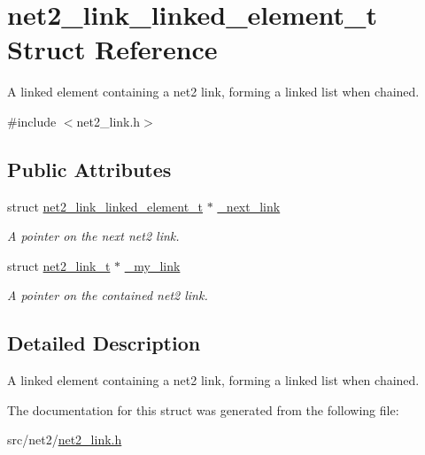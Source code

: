 \hypertarget{structnet2__link__linked__element__t}{\section{net2\-\_\-link\-\_\-linked\-\_\-element\-\_\-t Struct Reference}
\label{structnet2__link__linked__element__t}
}


A linked element containing a net2 link, forming a linked list when chained.  




{\ttfamily \#include $<$net2\-\_\-link.\-h$>$}

\subsection*{Public Attributes}
\begin{DoxyCompactItemize}
\item 
\hypertarget{structnet2__link__linked__element__t_a167564acaf196fac9ae24b3192367b33}{struct \hyperlink{structnet2__link__linked__element__t}{net2\-\_\-link\-\_\-linked\-\_\-element\-\_\-t} $\ast$ \hyperlink{structnet2__link__linked__element__t_a167564acaf196fac9ae24b3192367b33}{\-\_\-next\-\_\-link}}\label{structnet2__link__linked__element__t_a167564acaf196fac9ae24b3192367b33}

\begin{DoxyCompactList}\small\item\em A pointer on the next net2 link. \end{DoxyCompactList}\item 
\hypertarget{structnet2__link__linked__element__t_a9259dac034e68a1681460c73581072b7}{struct \hyperlink{structnet2__link__t}{net2\-\_\-link\-\_\-t} $\ast$ \hyperlink{structnet2__link__linked__element__t_a9259dac034e68a1681460c73581072b7}{\-\_\-my\-\_\-link}}\label{structnet2__link__linked__element__t_a9259dac034e68a1681460c73581072b7}

\begin{DoxyCompactList}\small\item\em A pointer on the contained net2 link. \end{DoxyCompactList}\end{DoxyCompactItemize}


\subsection{Detailed Description}
A linked element containing a net2 link, forming a linked list when chained. 

The documentation for this struct was generated from the following file\-:\begin{DoxyCompactItemize}
\item 
src/net2/\hyperlink{net2__link_8h}{net2\-\_\-link.\-h}\end{DoxyCompactItemize}
